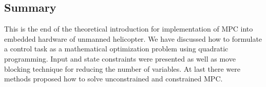 \subsection{Summary}

This is the end of the theoretical introduction for implementation of MPC into embedded hardware of unmanned helicopter. We have discussed how to formulate a control task as a mathematical optimization problem using quadratic programming. Input and state constraints were presented as well as move blocking technique for reducing the number of variables. At last there were methods proposed how to solve unconstrained and constrained MPC.